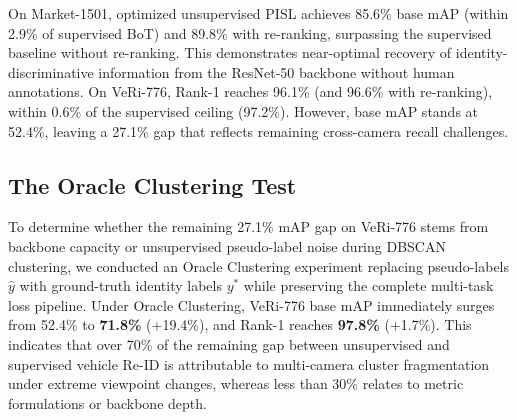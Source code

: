 \begin{table}[!ht]
\centering
\small
\caption[Comparison of optimized unsupervised PISL against supervised ceilings]{Comparison of optimized unsupervised PISL against fully supervised ResNet-50 performance ceilings.}
\label{tab:supervised_gap}
\end{table}

On Market-1501, optimized unsupervised PISL achieves 85.6\% base mAP (within 2.9\% of supervised BoT) and 89.8\% with re-ranking, surpassing the supervised baseline without re-ranking. This demonstrates near-optimal recovery of identity-discriminative information from the ResNet-50 backbone without human annotations. On VeRi-776, Rank-1 reaches 96.1\% (and 96.6\% with re-ranking), within 0.6\% of the supervised ceiling (97.2\%). However, base mAP stands at 52.4\%, leaving a 27.1\% gap that reflects remaining cross-camera recall challenges.

\subsection{The Oracle Clustering Test}
\label{sec:oracle_test}

To determine whether the remaining 27.1\% mAP gap on VeRi-776 stems from backbone capacity or unsupervised pseudo-label noise during DBSCAN clustering, we conducted an Oracle Clustering experiment replacing pseudo-labels $\hat{y}$ with ground-truth identity labels $y^*$ while preserving the complete multi-task loss pipeline. Under Oracle Clustering, VeRi-776 base mAP immediately surges from 52.4\% to \textbf{71.8\%} (+19.4\%), and Rank-1 reaches \textbf{97.8\%} (+1.7\%). This indicates that over 70\% of the remaining gap between unsupervised and supervised vehicle Re-ID is attributable to multi-camera cluster fragmentation under extreme viewpoint changes, whereas less than 30\% relates to metric formulations or backbone depth.

